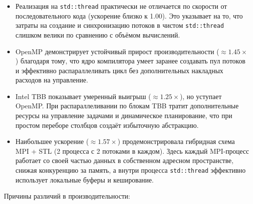 \documentclass[12pt]{article}
\begin{document}
\begin{itemize}
  \item Реализация на \texttt{std::thread} практически не отличается по скорости от последовательного кода (ускорение близко к 1.00). Это указывает на то, что затраты на создание и синхронизацию потоков в чистом \texttt{std::thread} слишком велики по сравнению с объёмом вычислений.
  \item OpenMP демонстрирует устойчивый прирост производительности (\(\approx1.45\times\)) благодаря тому, что ядро компилятора умеет заранее создавать пул потоков и эффективно распараллеливать цикл без дополнительных накладных расходов на управление.
  \item Intel TBB показывает умеренный выигрыш (\(\approx1.25\times\)), но уступает OpenMP. При распараллеливании по блокам TBB тратит дополнительные ресурсы на управление задачами и динамическое планирование, что при простом переборе столбцов создаёт избыточную абстракцию.
  \item Наибольшее ускорение (\(\approx1.57\times\)) продемонстрировала гибридная схема MPI + STL (2 процесса с 2 потоками в каждом). Здесь каждый MPI-процесс работает со своей частью данных в собственном адресном пространстве, снижая конкуренцию за память, а внутри процесса \texttt{std::thread} эффективно использует локальные буферы и кеширование.
\end{itemize}

Причины различий в производительности:
\end{document}
